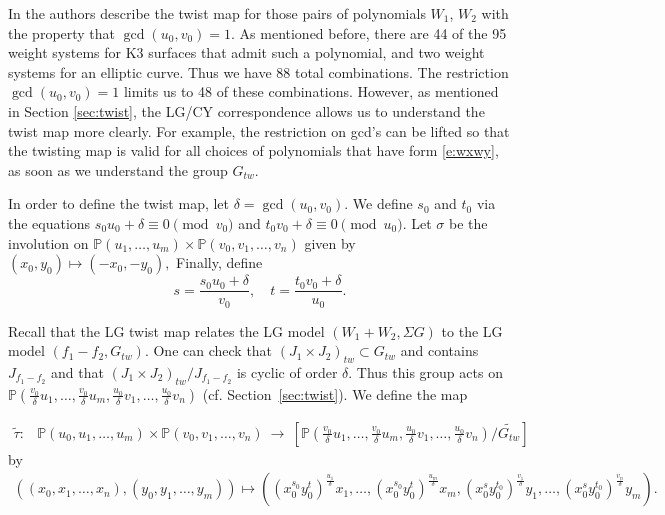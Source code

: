 \documentclass[10pt, letterpaper]{amsart}
\theoremstyle{remark}
\newcommand{\tw}[1]{{#1}_{tw}}
\newcommand{\s}[1]{\Sigma #1}
\begin{document}
In \cite{ABS} the authors describe the twist map for those pairs of polynomials $W_1$, $W_2$ with the property that $\gcd(u_0,v_0)=1$. As mentioned before, there are 44 of the 95 weight systems for K3 surfaces that admit such a polynomial, and two weight systems for an elliptic curve. Thus we have 88 total combinations. The restriction $\gcd(u_0,v_0)=1$ limits us to 48 of these combinations. However, as mentioned in Section \ref{sec:twist}, the LG/CY correspondence allows us to understand the twist map more clearly. For example, the restriction on gcd's can be lifted so that the twisting map is valid for all choices of polynomials that have form \eqref{e:wxwy}, as soon as we understand the group $\tw{G}$. 

In order to define the twist map, let $\delta=\gcd(u_0,v_0)$. We define $s_0$ and $t_0$ via the equations $s_0u_0+\delta\equiv 0\pmod {v_0}$ and $t_0v_0+\delta\equiv 0\pmod {u_0}$. Let $\sigma$ be the involution on $\mathbb{P}(u_1, \ldots, u_m) \times \mathbb{P}(v_0, v_1, \ldots, v_n)$ given by $(x_0, y_0) \mapsto (-x_0, -y_0),$ 
Finally, define 
\[
s=\frac{s_0u_0+\delta}{v_0},\quad t=\frac{t_0v_0+\delta}{u_0}.
\]

Recall that the LG twist map relates the LG model $(W_1+W_2,\s{G})$ to the LG model $(f_1-f_2,\tw{G})$. One can check that $\tw{(J_1\times J_2)}\subset \tw{G}$ and contains $J_{f_1-f_2}$ and that $\tw{(J_1\times J_2)}/J_{f_1-f_2}$ is cyclic of order $\delta$. Thus this group acts on $\mathbb{P}(\frac{v_0}{\delta}u_1, \ldots, \frac{v_0}{\delta} u_m, \frac{u_0}{\delta}v_1, \ldots, \frac{u_0}{\delta}v_n)$ (cf. Section~\ref{sec:twist}). We define the map


\begin{align*}
\tilde{\tau}: & \mathbb{P}(u_0, u_1, \ldots, u_m) \times \mathbb{P}(v_0, v_1, \ldots, v_n) %
\ \to \ \left[\mathbb{P}\left(\frac{v_0}{\delta}u_1, \ldots, \frac{v_0}{\delta} u_m, \frac{u_0}{\delta}v_1, \ldots, \frac{u_0}{\delta}v_n\right)/\widetilde{\tw{G}}\right]
\end{align*} 
by 
\begin{align*}
((x_0, x_1, \ldots, x_n), (y_0, y_1, \ldots, y_m)) \mapsto \left(\left(x_0^{s_0}y_0^t\right)^{\frac{u_1}{\delta}}x_1, \ldots, \left(x_0^{s_0}y_0^t\right)^{\frac{u_m}{\delta}}x_m, \left(x_0^sy_0^{t_0}\right)^{\frac{v_1}{\delta}}y_1, \ldots, \left(x_0^sy_0^{t_0}\right)^{\frac{v_n}{\delta}}y_m\right).
\end{align*} 
\end{document}
